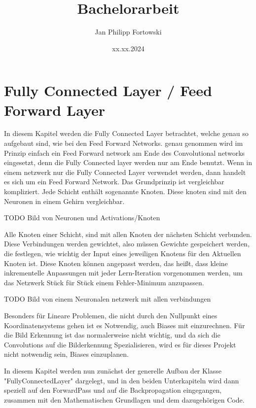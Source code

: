\documentclass[12pt]{article}
\title{\textbf{Bachelorarbeit}}
\author{Jan Philipp Fortowski}
\date{xx.xx.2024}
\begin{document}
\maketitle
\thispagestyle{empty}
\cleardoublepage
\tableofcontents
\thispagestyle{empty}
\cleardoublepage



\section{Fully Connected Layer / Feed Forward Layer}
In diesem Kapitel werden die Fully Connected Layer betrachtet, welche genau so aufgebaut sind, wie bei den Feed Forward Networks. genau genommen wird im Prinzip einfach ein Feed Forward network am Ende des Convolutional networks eingesetzt, denn die Fully Connected layer werden nur am Ende benutzt. Wenn in einem netzwerk nur die Fully Connected Layer verwendet werden, dann handelt es sich um ein Feed Forward Network. 
Das Grundprinzip ist vergleichbar kompliziert. Jede Schicht enthält sogenannte Knoten. Diese knoten sind mit den Neuronen in einem Gehirn vergleichbar.

TODO Bild von Neuronen und Activations/Knoten

Alle Knoten einer Schicht, sind mit allen Knoten der nächsten Schicht verbunden. Diese Verbindungen werden gewichtet, also müssen Gewichte gespeichert werden, die festlegen, wie wichtig der Input eines jeweiligen Knotens für den Aktuellen Knoten ist. Diese Knoten können angepasst werden, das heißt, dass kleine inkrementelle Anpassungen mit jeder Lern-Iteration vorgenommen werden, um das Netzwerk Stück für Stück einem Fehler-Minimum anzupassen. 

TODO Bild von einem Neuronalen netzwerk mit allen verbindungen

Besonders für Lineare Problemen, die nicht durch den Nullpunkt eines Koordinatensystems gehen ist es Notwendig, auch Biases mit einzurechnen. Für die Bild Erkennung ist das normalerweise nicht wichtig, und da sich die Convolutions auf die Bilderkennung Spezialisieren, wird es für dieses Projekt nicht notwendig sein, Biases einzuplanen.

In diesem Kapitel werden nun zunächst der generelle Aufbau der Klasse "FullyConnectedLayer" dargelegt, und in den beiden Unterkapiteln wird dann speziell auf den ForwardPass und auf die Backpropagation eingegangen, zusammen mit den Mathematischen Grundlagen und dem dazugehörigen Code.
\end{document}
